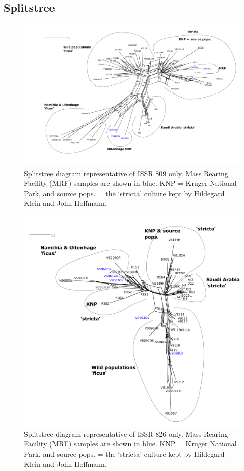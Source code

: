 \begin{landscape}
\subsection{Splitstree}
\label{appendix:issrSplitstrees}

\begin{figure}[H]
	\centering
	\includegraphics[scale =0.6]{Images/issr809_splitstree.pdf}
	\caption{Splitstree diagram representative of ISSR 809 only. Mass Rearing Facility (MRF) samples are shown in blue. KNP = Kruger National Park, and source pops. = the `stricta' culture kept by Hildegard Klein and John Hoffmann.} 
	\label{fig:issr809_splitstree}
\end{figure}
\end{landscape}


\begin{figure}[H]
	\centering
	\includegraphics[scale =0.6]{Images/issr826_splitstree.pdf}
	\caption{Splitstree diagram representative of ISSR 826 only. Mass Rearing Facility (MRF) samples are shown in blue. KNP = Kruger National Park, and source pops. = the `stricta' culture kept by Hildegard Klein and John Hoffmann.} 
	\label{fig:issr826_splitstree}
\end{figure}

